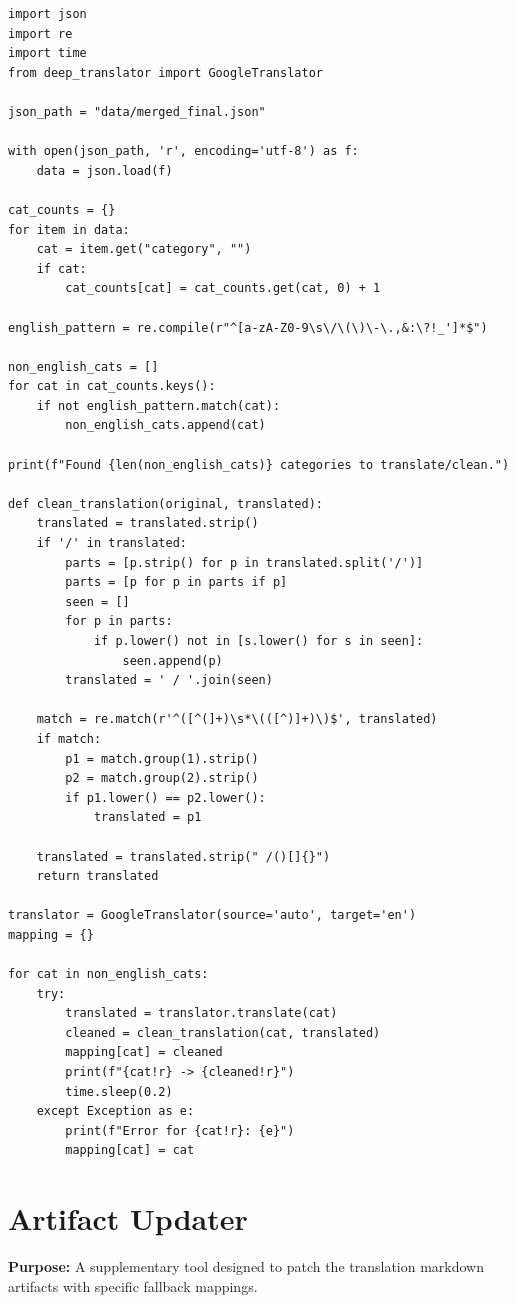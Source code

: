 \documentclass[11pt]{article}
\begin{document}
\begin{lstlisting}[style=pythoncode, caption={translate\_remaining.py}]
import json
import re
import time
from deep_translator import GoogleTranslator

json_path = "data/merged_final.json"

with open(json_path, 'r', encoding='utf-8') as f:
    data = json.load(f)

cat_counts = {}
for item in data:
    cat = item.get("category", "")
    if cat:
        cat_counts[cat] = cat_counts.get(cat, 0) + 1

english_pattern = re.compile(r"^[a-zA-Z0-9\s\/\(\)\-\.,&:\?!_']*$")

non_english_cats = []
for cat in cat_counts.keys():
    if not english_pattern.match(cat):
        non_english_cats.append(cat)

print(f"Found {len(non_english_cats)} categories to translate/clean.")

def clean_translation(original, translated):
    translated = translated.strip()
    if '/' in translated:
        parts = [p.strip() for p in translated.split('/')]
        parts = [p for p in parts if p]
        seen = []
        for p in parts:
            if p.lower() not in [s.lower() for s in seen]:
                seen.append(p)
        translated = ' / '.join(seen)
        
    match = re.match(r'^([^(]+)\s*\(([^)]+)\)$', translated)
    if match:
        p1 = match.group(1).strip()
        p2 = match.group(2).strip()
        if p1.lower() == p2.lower():
            translated = p1
            
    translated = translated.strip(" /()[]{}")
    return translated

translator = GoogleTranslator(source='auto', target='en')
mapping = {}

for cat in non_english_cats:
    try:
        translated = translator.translate(cat)
        cleaned = clean_translation(cat, translated)
        mapping[cat] = cleaned
        print(f"{cat!r} -> {cleaned!r}")
        time.sleep(0.2)
    except Exception as e:
        print(f"Error for {cat!r}: {e}")
        mapping[cat] = cat
\end{lstlisting}


\section{Artifact Updater} \label{sec:updater}
\textbf{Purpose:} A supplementary tool designed to patch the translation markdown artifacts with specific fallback mappings.
\end{document}
